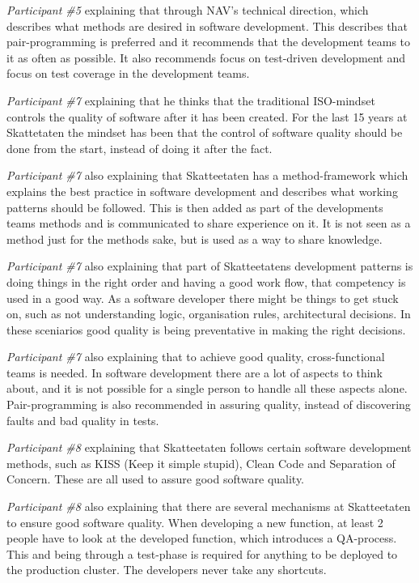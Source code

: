 \textit{Participant \#5} explaining that through NAV's technical direction, which describes what methods are desired in software development. This describes that pair-programming is preferred and it recommends that the development teams to it as often as possible. It also recommends focus on test-driven development and focus on test coverage in the development teams.

\textit{Participant \#7} explaining that he thinks that the traditional ISO-mindset controls the quality of software after it has been created. For the last 15 years at Skattetaten the mindset has been that the control of software quality should be done from the start, instead of doing it after the fact.

\textit{Participant \#7} also explaining that Skatteetaten has a method-framework which explains the best practice in software development and describes what working patterns should be followed. This is then added as part of the developments teams methods and is communicated to share experience on it. It is not seen as a method just for the methods sake, but is used as a way to share knowledge.

\textit{Participant \#7} also explaining that part of Skatteetatens development patterns is doing things in the right order and having a good work flow, that competency is used in a good way. As a software developer there might be things to get stuck on, such as not understanding logic, organisation rules, architectural decisions. In these sceniarios good quality is being preventative in making the right decisions.

\textit{Participant \#7} also explaining that to achieve good quality, cross-functional teams is needed. In software development there are a lot of aspects to think about, and it is not possible for a single person to handle all these aspects alone. Pair-programming is also recommended in assuring quality, instead of discovering faults and bad quality in tests.

\textit{Participant \#8} explaining that Skatteetaten follows certain software development methods, such as KISS (Keep it simple stupid), Clean Code and Separation of Concern. These are all used to assure good software quality.

\textit{Participant \#8} also explaining that there are several mechanisms at Skatteetaten to ensure good software quality. When developing a new function, at least 2 people have to look at the developed function, which introduces a QA-process. This and being through a test-phase is required for anything to be deployed to the production cluster. The developers never take any shortcuts. 

